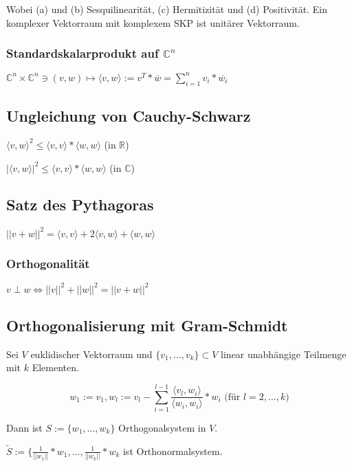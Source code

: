 Wobei (a) und (b) Sesquilinearität, (c) Hermitizität und (d) Positivität. Ein komplexer Vektorraum mit komplexem SKP ist unitärer Vektorraum.

\subsubsection*{Standardskalarprodukt auf $\mathbb{C}^n$}

$\mathbb{C}^n \times \mathbb{C}^n \ni (v, w) \mapsto \langle v, w \rangle := v^T * \overline w = \sum_{i=1}^n v_i * \overline{w_i}$

\subsection*{Ungleichung von Cauchy-Schwarz}

$\langle v, w \rangle ^2 \leq \langle v, v \rangle * \langle w, w \rangle$ (in $\mathbb{R}$)

$|\langle v, w \rangle |^2 \leq \langle v, v \rangle * \langle w, w \rangle$ (in $\mathbb{C}$)

\subsection*{Satz des Pythagoras}

$||v+w||^2 = \langle v, v \rangle + 2\langle v, w \rangle + \langle w, w \rangle$

\subsubsection*{Orthogonalität}

$v \perp w \Leftrightarrow ||v||^2 + ||w||^2 = ||v+w||^2$

\subsection*{Orthogonalisierung mit Gram-Schmidt}

Sei $V$ euklidischer Vektorraum und $\{v_1, ..., v_k\} \subset V$ linear unabhängige Teilmenge mit $k$ Elementen.

\vspace*{-4mm}
$$w_1 := v_1, w_l := v_l - \sum_{i=1}^{l-1} \frac{\langle v_l, w_i \rangle}{\langle w_i, w_i\rangle}*w_i \text{ (für } l = 2, ..., k)$$

Dann ist $S := \{w_1, ..., w_k\}$ Orthogonalsystem in $V$.

$\tilde S := \{\frac{1}{||w_1||}*w_1, ..., \frac{1}{||w_k||}*w_k$ ist Orthonormalsystem.

